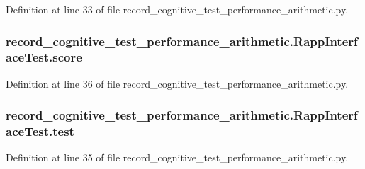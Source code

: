 Definition at line 33 of file record\-\_\-cognitive\-\_\-test\-\_\-performance\-\_\-arithmetic.\-py.

\hypertarget{classrecord__cognitive__test__performance__arithmetic_1_1RappInterfaceTest_a7159092b7bb5df1274d91a4daa502fa0}{
\subsubsection[{score}]{\setlength{\rightskip}{0pt plus 5cm}record\-\_\-cognitive\-\_\-test\-\_\-performance\-\_\-arithmetic.\-Rapp\-Interface\-Test.\-score}}\label{classrecord__cognitive__test__performance__arithmetic_1_1RappInterfaceTest_a7159092b7bb5df1274d91a4daa502fa0}


Definition at line 36 of file record\-\_\-cognitive\-\_\-test\-\_\-performance\-\_\-arithmetic.\-py.

\hypertarget{classrecord__cognitive__test__performance__arithmetic_1_1RappInterfaceTest_a670050956517cab203e47391cb2a56ff}{
\subsubsection[{test}]{\setlength{\rightskip}{0pt plus 5cm}record\-\_\-cognitive\-\_\-test\-\_\-performance\-\_\-arithmetic.\-Rapp\-Interface\-Test.\-test}}\label{classrecord__cognitive__test__performance__arithmetic_1_1RappInterfaceTest_a670050956517cab203e47391cb2a56ff}


Definition at line 35 of file record\-\_\-cognitive\-\_\-test\-\_\-performance\-\_\-arithmetic.\-py.

